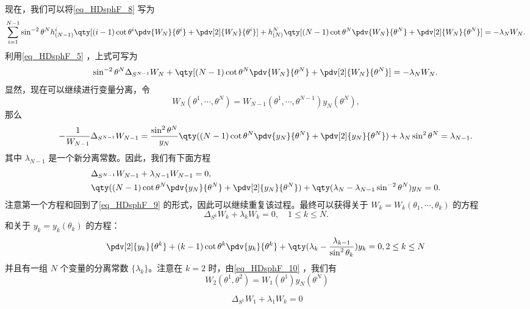 现在，我们可以将\autoref{eq_HDsphF_8} 写为
\begin{equation}
\sum_{i=1}^{N-1} \sin^{-2}\theta^N h^{i}_{(N-1)}\qty[(i-1)\cot\theta^i\pdv{W_N}{\theta^i}+\pdv[2]{W_N}{\theta^i}]+h^{N}_{(N)}\qty[(N-1)\cot\theta^N\pdv{W_N}{\theta^N}+\pdv[2]{W_N}{\theta^N}]=-\lambda_N W_N.~
\end{equation}
利用\autoref{eq_HDsphF_5} ，上式可写为
\begin{equation}
\sin^{-2}\theta^N \Delta_{S^{N-1}}{W_N}+\qty[(N-1)\cot\theta^N\pdv{W_N}{\theta^N}+\pdv[2]{W_N}{\theta^N}]=-\lambda_N W_N.~
\end{equation}
显然，现在可以继续进行变量分离，令
\begin{equation}\label{eq_HDsphF_10}
W_N(\theta^1,\cdots,\theta^N)=W_{N-1}(\theta^1,\cdots,\theta^{N-1})y_N(\theta^N),~
\end{equation}
那么
\begin{equation}
-\frac{1}{W_{N-1}}\Delta_{S^{N-1}}W_{N-1}=\frac{\sin^2\theta^N}{y_N}\qty((N-1)\cot\theta^N\pdv{y_N}{\theta^N}+\pdv[2]{y_N}{\theta^N})+\lambda_N\sin^2\theta^N=\lambda_{N-1}.~
\end{equation}
其中 $\lambda_{N-1}$ 是一个新分离常数。因此，我们有下面方程
\begin{equation}
\begin{aligned}
&\Delta_{S^{N-1}}W_{N-1}+\lambda_{N-1}W_{N-1}=0,\\
&\qty((N-1)\cot\theta^N\pdv{y_N}{\theta^N}+\pdv[2]{y_N}{\theta^N})+\qty(\lambda_N-\lambda_{N-1}\sin^{-2}\theta^N)y_N=0.
\end{aligned}~
\end{equation}
注意第一个方程和回到了\autoref{eq_HDsphF_9} 的形式，因此可以继续重复该过程。最终可以获得关于 $W_k=W_k(\theta_1,\cdots,\theta_k)$ 的方程
\begin{equation}
\Delta_{S^{k}}W_{k}+\lambda_{k}W_{k}=0,\quad 1\leq k\leq N.~
\end{equation}
和关于 $y_k=y_k(\theta_k)$ 的方程：
\begin{equation}
\pdv[2]{y_k}{\theta^k}+(k-1)\cot\theta^k\pdv{y_k}{\theta^k}+\qty(\lambda_k-\frac{\lambda_{k-1}}{\sin^2\theta_k})y_k=0,2\leq k\leq N~
\end{equation}
并且有一组 $N$ 个变量的分离常数 $\{\lambda_k\}$。注意在 $k=2$ 时，由\autoref{eq_HDsphF_10} ，我们有
\begin{equation}
W_2(\theta^1,\theta^2)=W_1(\theta^1)y_N(\theta^N)
\end{equation}

\begin{equation}
\Delta_{S^{1}}W_{1}+\lambda_{1}W_{k}=0
\end{equation}










